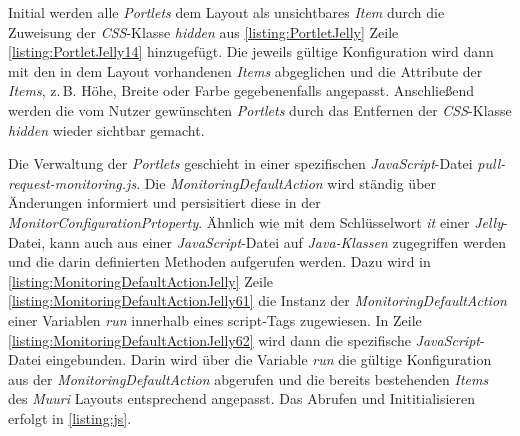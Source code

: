 Initial werden alle \textit{Portlets} dem Layout als unsichtbares \textit{Item} durch die Zuweisung der \textit{CSS}-Klasse \textit{hidden} aus \autoref{listing:PortletJelly} Zeile \autoref{listing:PortletJelly14} hinzugefügt. Die jeweils gültige Konfiguration wird dann mit den in dem Layout vorhandenen \textit{Items} abgeglichen und die Attribute der \textit{Items}, z.\,B. Höhe, Breite oder Farbe gegebenenfalls angepasst. Anschließend werden die vom Nutzer gewünschten \textit{Portlets} durch das Entfernen der \textit{CSS}-Klasse \textit{hidden} wieder sichtbar gemacht.

Die Verwaltung der \textit{Portlets} geschieht in einer spezifischen \textit{JavaScript}-Datei \textit{pull-request-monitoring.js}. Die \textit{MonitoringDefaultAction} wird ständig über Änderungen informiert und persisitiert diese in der \textit{MonitorConfigurationPrtoperty}. Ähnlich wie mit dem Schlüsselwort \textit{it} einer \textit{Jelly}-Datei, kann auch aus einer \textit{JavaScript}-Datei auf \textit{Java-Klassen} zugegriffen werden und die darin definierten Methoden aufgerufen werden. Dazu wird in \autoref{listing:MonitoringDefaultActionJelly} Zeile \autoref{listing:MonitoringDefaultActionJelly61} die Instanz der \textit{MonitoringDefaultAction} einer Variablen \textit{run} innerhalb eines script-Tags zugewiesen. In Zeile \autoref{listing:MonitoringDefaultActionJelly62} wird dann die spezifische \textit{JavaScript}-Datei eingebunden. Darin wird über die Variable \textit{run} die gültige Konfiguration aus der \textit{MonitoringDefaultAction} abgerufen und die bereits bestehenden \textit{Items} des \textit{Muuri} Layouts entsprechend angepasst. Das Abrufen und Inititialisieren erfolgt in \autoref{listing:js}.




